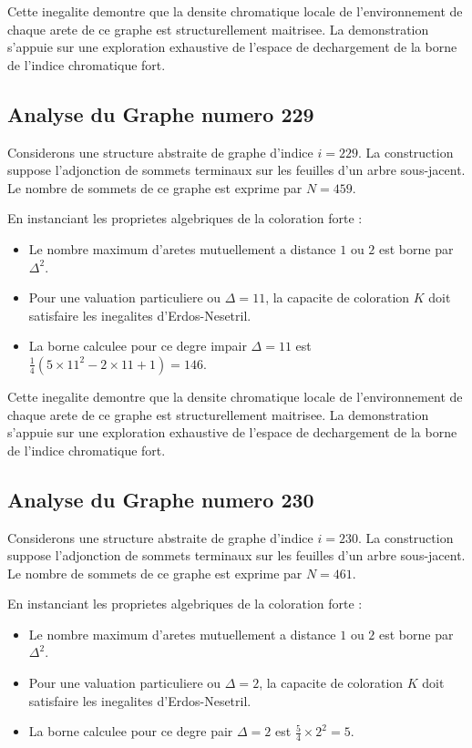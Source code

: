 \documentclass[11pt,a4paper]{article}
\begin{document}
Cette inegalite demontre que la densite chromatique locale de l'environnement de chaque arete de ce graphe est structurellement maitrisee. La demonstration s'appuie sur une exploration exhaustive de l'espace de dechargement de la borne de l'indice chromatique fort.

\subsection{Analyse du Graphe numero 229}
Considerons une structure abstraite de graphe d'indice $i = 229$. La construction suppose l'adjonction de sommets terminaux sur les feuilles d'un arbre sous-jacent. Le nombre de sommets de ce graphe est exprime par $N = 459$.

En instanciant les proprietes algebriques de la coloration forte :
\begin{itemize}
\item Le nombre maximum d'aretes mutuellement a distance $1$ ou $2$ est borne par $\Delta^2$.
\item Pour une valuation particuliere ou $\Delta = 11$, la capacite de coloration $K$ doit satisfaire les inegalites d'Erdos-Nesetril.
\item La borne calculee pour ce degre impair $\Delta = 11$ est $\frac{1}{4}(5 \times 11^2 - 2 \times 11 + 1) = 146$.
\end{itemize}

Cette inegalite demontre que la densite chromatique locale de l'environnement de chaque arete de ce graphe est structurellement maitrisee. La demonstration s'appuie sur une exploration exhaustive de l'espace de dechargement de la borne de l'indice chromatique fort.

\subsection{Analyse du Graphe numero 230}
Considerons une structure abstraite de graphe d'indice $i = 230$. La construction suppose l'adjonction de sommets terminaux sur les feuilles d'un arbre sous-jacent. Le nombre de sommets de ce graphe est exprime par $N = 461$.

En instanciant les proprietes algebriques de la coloration forte :
\begin{itemize}
\item Le nombre maximum d'aretes mutuellement a distance $1$ ou $2$ est borne par $\Delta^2$.
\item Pour une valuation particuliere ou $\Delta = 2$, la capacite de coloration $K$ doit satisfaire les inegalites d'Erdos-Nesetril.
\item La borne calculee pour ce degre pair $\Delta = 2$ est $\frac{5}{4} \times 2^2 = 5$.
\end{itemize}
\end{document}
